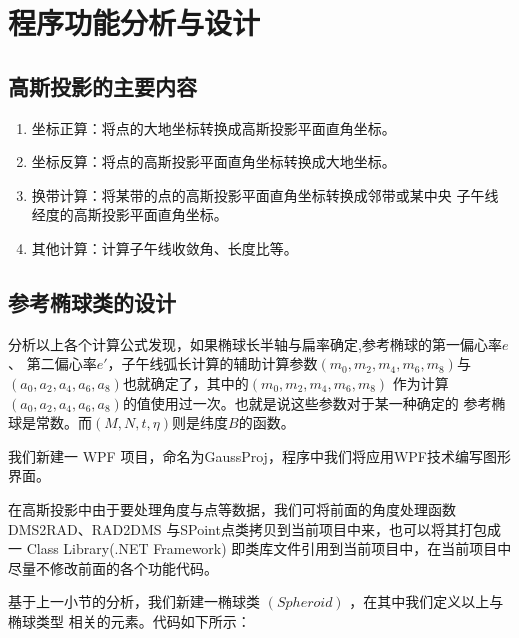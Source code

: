 \section{程序功能分析与设计}

\subsection{高斯投影的主要内容}
\begin{enumerate}
    \item 坐标正算：将点的大地坐标转换成高斯投影平面直角坐标。
    \item 坐标反算：将点的高斯投影平面直角坐标转换成大地坐标。
    \item 换带计算：将某带的点的高斯投影平面直角坐标转换成邻带或某中央
          子午线经度的高斯投影平面直角坐标。
    \item 其他计算：计算子午线收敛角、长度比等。
\end{enumerate}

\subsection{参考椭球类的设计}

分析以上各个计算公式发现，如果椭球长半轴与扁率确定,参考椭球的第一偏心率$e$、
第二偏心率$e'$，子午线弧长计算的辅助计算参数$(m_0, m_2, m_4, m_6, m_8)$与
$(a_0, a_2, a_4, a_6, a_8)$也就确定了，其中的$(m_0, m_2, m_4, m_6, m_8)$
作为计算$(a_0, a_2, a_4, a_6, a_8)$的值使用过一次。也就是说这些参数对于某一种确定的
参考椭球是常数。而$(M,N,t,\eta)$则是纬度$B$的函数。

我们新建一 WPF 项目，命名为GaussProj，程序中我们将应用WPF技术编写图形界面。

在高斯投影中由于要处理角度与点等数据，我们可将前面的角度处理函数 DMS2RAD、RAD2DMS
与SPoint点类拷贝到当前项目中来，也可以将其打包成一 Class Library(.NET Framework)
即类库文件引用到当前项目中，在当前项目中尽量不修改前面的各个功能代码。

基于上一小节的分析，我们新建一椭球类 $(Spheroid)$ ，在其中我们定义以上与椭球类型
相关的元素。代码如下所示：

